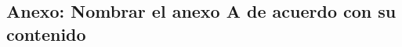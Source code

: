 \begin{appendix}
\chapter{Anexo: Nombrar el anexo A de acuerdo con su contenido}\label{AnexoA}
\end{appendix}
